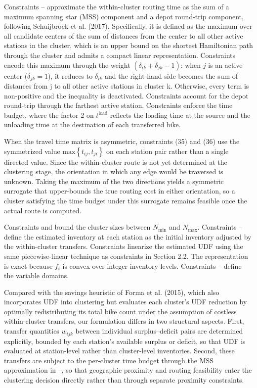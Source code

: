 \documentclass[11pt]{article}
\numberwithin{table}{section}
\numberwithin{figure}{section}
\begin{document}
Constraints – approximate the within-cluster routing time as the sum of a maximum spanning star (MSS) component and a depot round-trip component, following Schuijbroek et al. (2017). Specifically, it is defined as the maximum over all candidate centers of the sum of distances from the center to all other active stations in the cluster, which is an upper bound on the shortest Hamiltonian path through the cluster and admits a compact linear representation. Constraints  encode this maximum through the weight $\left( {{\delta }_{ik}}+{{\delta }_{jk}}-1 \right)$: when $j$ is an active center (${{\delta }_{jk}}=1$), it reduces to ${{\delta }_{ik}}$ and the right-hand side becomes the sum of distances from j to all other active stations in cluster k. Otherwise, every term is non-positive and the inequality is deactivated. Constraints  account for the depot round-trip through the farthest active station. Constraints  enforce the time budget, where the factor 2 on ${{t}^{\text{load}}}$ reflects the loading time at the source and the unloading time at the destination of each transferred bike.

When the travel time matrix is asymmetric, constraints (35) and (36) use the symmetrized value $\text{max}\left\{ {{t}_{ij}},{{t}_{ji}} \right\}$ on each station pair rather than a single directed value. Since the within-cluster route is not yet determined at the clustering stage, the orientation in which any edge would be traversed is unknown. Taking the maximum of the two directions yields a symmetric surrogate that upper-bounds the true routing cost in either orientation, so a cluster satisfying the time budget under this surrogate remains feasible once the actual route is computed.

Constraints  and  bound the cluster sizes between $N_{\min}$ and $N_{\max}$. Constraints – define the estimated inventory at each station as the initial inventory adjusted by the within-cluster transfers. Constraints  linearize the estimated UDF using the same piecewise-linear technique as constraints  in Section 2.2. The representation is exact because $f_i$ is convex over integer inventory levels. Constraints – define the variable domains.

Compared with the savings heuristic of Forma et al. (2015), which also incorporates UDF into clustering but evaluates each cluster’s UDF reduction by optimally redistributing its total bike count under the assumption of costless within-cluster transfers, our formulation differs in two structural aspects. First, transfer quantities $w_{ijk}$ between individual surplus–deficit pairs are determined explicitly, bounded by each station's available surplus or deficit, so that UDF is evaluated at station-level rather than cluster-level inventories. Second, these transfers are subject to the per-cluster time budget through the MSS approximation in –, so that geographic proximity and routing feasibility enter the clustering decision directly rather than through separate proximity constraints.
\end{document}
